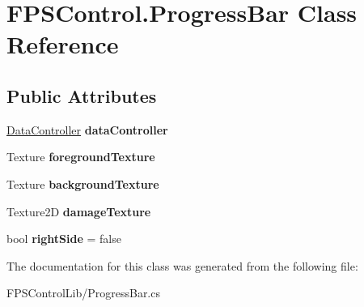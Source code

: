 \hypertarget{class_f_p_s_control_1_1_progress_bar}{\section{F\-P\-S\-Control.\-Progress\-Bar Class Reference}
\label{class_f_p_s_control_1_1_progress_bar}
}
\subsection*{Public Attributes}
\begin{DoxyCompactItemize}
\item 
\hypertarget{class_f_p_s_control_1_1_progress_bar_ae6541bccb307e705a3f104e2f90c67f8}{\hyperlink{class_f_p_s_control_1_1_data_controller}{Data\-Controller} {\bfseries data\-Controller}}\label{class_f_p_s_control_1_1_progress_bar_ae6541bccb307e705a3f104e2f90c67f8}

\item 
\hypertarget{class_f_p_s_control_1_1_progress_bar_afcb698911f9b57764adb196e57ab207c}{Texture {\bfseries foreground\-Texture}}\label{class_f_p_s_control_1_1_progress_bar_afcb698911f9b57764adb196e57ab207c}

\item 
\hypertarget{class_f_p_s_control_1_1_progress_bar_a84e339f3fc18c856328d4e0326158238}{Texture {\bfseries background\-Texture}}\label{class_f_p_s_control_1_1_progress_bar_a84e339f3fc18c856328d4e0326158238}

\item 
\hypertarget{class_f_p_s_control_1_1_progress_bar_a70d4d42adb3cf1f0ce2201f0c09e8511}{Texture2\-D {\bfseries damage\-Texture}}\label{class_f_p_s_control_1_1_progress_bar_a70d4d42adb3cf1f0ce2201f0c09e8511}

\item 
\hypertarget{class_f_p_s_control_1_1_progress_bar_a7d0a4c85de4dc3a404be91b9a95f9004}{bool {\bfseries right\-Side} = false}\label{class_f_p_s_control_1_1_progress_bar_a7d0a4c85de4dc3a404be91b9a95f9004}

\end{DoxyCompactItemize}


The documentation for this class was generated from the following file\-:\begin{DoxyCompactItemize}
\item 
F\-P\-S\-Control\-Lib/Progress\-Bar.\-cs\end{DoxyCompactItemize}
